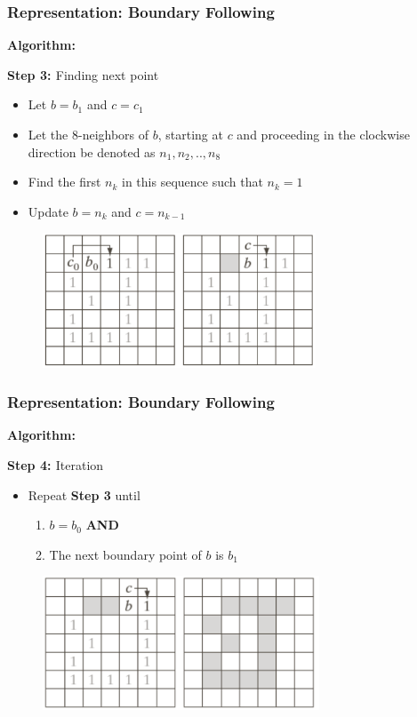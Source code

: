 \documentclass[english,11pt,table,handout]{beamer}
\begin{document}
\frame
{
	\frametitle{Representation: Boundary Following}
	\textbf{Algorithm:}
	\begin{block}{\textbf{\alert{Step 3: }} Finding next point}
	\end{block}
	\begin{itemize}
		\item Let $b = b_1$ and $c = c_1$
		\item Let the 8-neighbors of $b$, starting at $c$ and proceeding in the clockwise direction be denoted as $n_1, n_2, .., n_8$
		\item Find the first $n_k$ in this sequence such that $n_k = 1$
		\item Update $b=n_k$ and $c=n_{k-1}$
	\end{itemize}
	\begin{figure}[!h]
		\includegraphics[height=4cm]{bfollow_2.png}
	\end{figure}	
}

\frame
{
	\frametitle{Representation: Boundary Following}
	\textbf{Algorithm:}
	\begin{block}{\textbf{\alert{Step 4: }} Iteration}
	\end{block}
	\begin{itemize}
		\item Repeat \textbf{\alert{Step 3}} until
			\begin{enumerate}
				\item $b = b_0$ \textbf{\alert{AND}} 
				\item The next boundary point of $b$ is $b_1$
			\end{enumerate}
	\end{itemize}
	\begin{figure}[!h]
		\includegraphics[height=4cm]{bfollow_3.png}
	\end{figure}	
	
}
\end{document}
